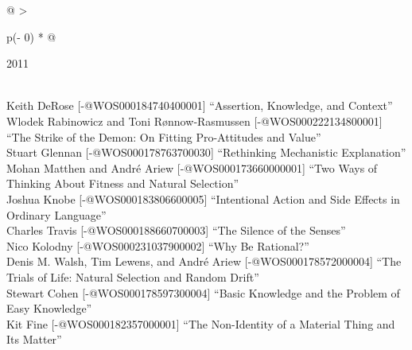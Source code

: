 \documentclass[
  10pt,
  letterpaper,
  DIV=11,
  numbers=noendperiod,
  twoside]{scrartcl}
\begin{document}
\begin{longtable}[]{@{}
  >{\raggedright\arraybackslash}p{(\columnwidth - 0\tabcolsep) * }@{}}

\caption{\label{tbl-top-ten-2002}Most cited articles published less than
ten years ago as of 2011.}

\tabularnewline

\toprule\noalign{}
\begin{minipage}[b]{\linewidth}\raggedright
2011
\end{minipage} \\
\midrule\noalign{}
\endhead
\bottomrule\noalign{}
\endlastfoot
Keith DeRose {[}-@WOS000184740400001{]} ``Assertion, Knowledge, and
Context'' \\
Wlodek Rabinowicz and Toni Rønnow‐Rasmussen {[}-@WOS000222134800001{]}
``The Strike of the Demon: On Fitting Pro-Attitudes and Value'' \\
Stuart Glennan {[}-@WOS000178763700030{]} ``Rethinking Mechanistic
Explanation'' \\
Mohan Matthen and André Ariew {[}-@WOS000173660000001{]} ``Two Ways of
Thinking About Fitness and Natural Selection'' \\
Joshua Knobe {[}-@WOS000183806600005{]} ``Intentional Action and Side
Effects in Ordinary Language'' \\
Charles Travis {[}-@WOS000188660700003{]} ``The Silence of the
Senses'' \\
Nico Kolodny {[}-@WOS000231037900002{]} ``Why Be Rational?'' \\
Denis M. Walsh, Tim Lewens, and André Ariew {[}-@WOS000178572000004{]}
``The Trials of Life: Natural Selection and Random Drift'' \\
Stewart Cohen {[}-@WOS000178597300004{]} ``Basic Knowledge and the
Problem of Easy Knowledge'' \\
Kit Fine {[}-@WOS000182357000001{]} ``The Non-Identity of a Material
Thing and Its Matter'' \\

\end{longtable}
\end{document}
